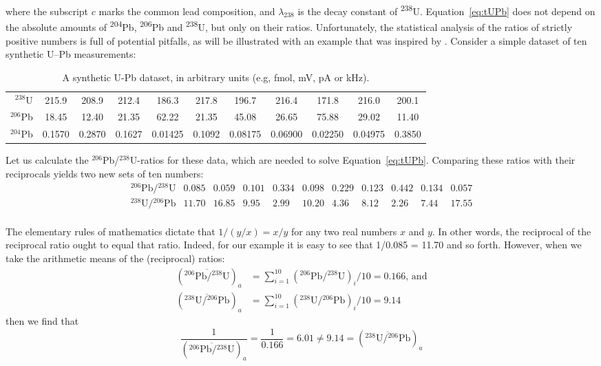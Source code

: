 \documentclass{article}
\begin{document}
\noindent where the subscript $c$ marks the common lead composition,
and $\lambda_{238}$ is the decay constant of \textsuperscript{238}U.
Equation~\ref{eq:tUPb} does not depend on the absolute amounts of
\textsuperscript{204}Pb, \textsuperscript{206}Pb and
\textsuperscript{238}U, but only on their ratios. Unfortunately, the
statistical analysis of the ratios of strictly positive numbers is
full of potential pitfalls, as will be illustrated with an example
that was inspired by \citet{mclean2016}. Consider a simple dataset of
ten synthetic U--Pb measurements:
\begin{table}[!ht]
\begin{tabular}{r|cccccccccc}
  $^{238}$U & 215.9 & 208.9 & 212.4 & 186.3 &
  217.8 & 196.7 & 216.4 & 171.8 & 216.0 & 200.1 \\
  $^{206}$Pb & 18.45 & 12.40 & 21.35 & 62.22 & 21.35 &
  45.08 & 26.65 & 75.88 & 29.02 & 11.40 \\
  $^{204}$Pb & 0.1570 & 0.2870 & 0.1627 & 0.01425 & 0.1092 &
  0.08175 & 0.06900 & 0.02250 & 0.04975 & 0.3850
\end{tabular}
\caption{A synthetic U-Pb dataset, in arbitrary units (e.g, fmol, mV,
  pA or kHz).}
\label{tab:UPb}
\end{table}

Let us calculate the ${}^{206}$Pb/${}^{238}$U-ratios for these data,
which are needed to solve Equation~\ref{eq:tUPb}. Comparing these
ratios with their reciprocals yields two new sets of ten numbers:
\[
  \begin{array}{c|cccccccccc}
    {}^{206}\mbox{Pb}/{}^{238}\mbox{U} &
    0.085 & 0.059 & 0.101 & 0.334 & 0.098 &
    0.229 & 0.123 & 0.442 & 0.134 & 0.057\\
    {}^{238}\mbox{U}/{}^{206}\mbox{Pb} &
    11.70 & 16.85 & 9.95 & 2.99 & 10.20 &
    4.36 & 8.12 & 2.26 & 7.44 & 17.55\\
\end{array}
\]

The elementary rules of mathematics dictate that $1/(y/x) = x/y$ for
any two real numbers $x$ and $y$. In other words, the reciprocal of
the reciprocal ratio ought to equal that ratio. Indeed, for our
example it is easy to see that 1/0.085 = 11.70 and so forth. However,
when we take the arithmetic means of the (reciprocal) ratios:
\[
\begin{array}{rl}
\left(\overline{{}^{206}\mbox{Pb}/{}^{238}\mbox{U}}\right)_{\!a} & =
\sum\limits_{i=1}^{10} \left({}^{206}\mbox{Pb}/
    {}^{238}\mbox{U}\right)_i/10 = 0.166 \mbox{, and}\\
\left(\overline{{}^{238}\mbox{U}/{}^{206}\mbox{Pb}}\right)_{\!a} & =
\sum\limits_{i=1}^{10} \left({}^{238}\mbox{U}/
    {}^{206}\mbox{Pb}\right)_i/10 = 9.14
\end{array}
\]
then we find that
\[
\frac{1}{\left(\overline{{}^{206}\mbox{Pb}/{}^{238}\mbox{U}}\right)_{\!a}} =
\frac{1}{0.166} = 6.01 \neq 9.14 = 
\left(\overline{{}^{238}\mbox{U}/{}^{206}\mbox{Pb}}\right)_{\!a}
\]
\end{document}
